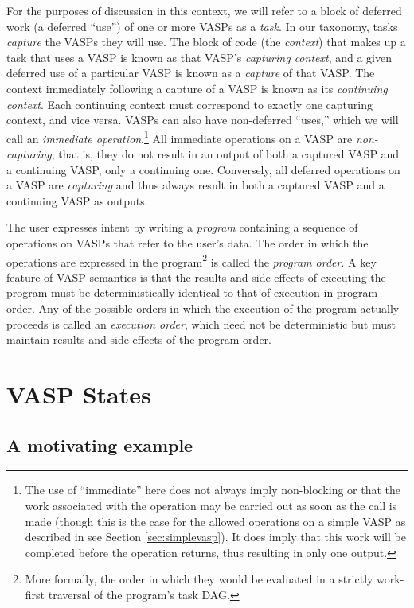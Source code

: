 For the purposes of discussion in this context, we will refer to a block of
deferred work (a deferred ``use'') of one or more VASPs as a {\it task}.
In our taxonomy, tasks {\it capture} the VASPs they will use. The block of code
(the {\it context}) that makes up a task that uses a VASP is known as that
VASP's {\it capturing context}, and a given deferred use of a particular VASP is
known as a {\it capture} of that VASP. The context immediately following a
capture of a VASP is known as its {\it continuing context}.  Each continuing
context must correspond to exactly one capturing context, and vice versa.  VASPs
can also have non-deferred ``uses,'' which we will call an {\it immediate
operation}.\footnote{The use of ``immediate'' here does not always imply
non-blocking or that the work associated with the operation may be carried out
as soon as the call is made (though this is the case for the allowed operations
on a simple VASP as described in see Section \ref{sec:simplevasp}).  It does
imply that this work will be completed before the operation returns, thus
resulting in only one output.} All immediate operations on a VASP are {\it
non-capturing}; that is, they do not result in an output of both a captured VASP
and a continuing VASP, only a continuing one.  Conversely, all deferred
operations on a VASP are {\it capturing} and thus always result in both a
captured VASP and a continuing VASP as outputs.  

The user expresses intent by writing a {\it program} containing a sequence of
operations on VASPs that refer to the user's data.  The order in which the
operations are expressed in the program\footnote{More formally, the order in
which they would be evaluated in a strictly work-first traversal of the
program's task DAG.} is called the {\it program order}.  A key feature of VASP
semantics is that the results and side effects of executing the program must be
deterministically identical to that of execution in program order.  Any of the
possible orders in which the execution of the program actually proceeds is
called an {\it execution order}, which need not be deterministic but must
maintain results and side effects of the program order.

\section{VASP States}

\subsection{A motivating example}
\label{subsec:motiv}

